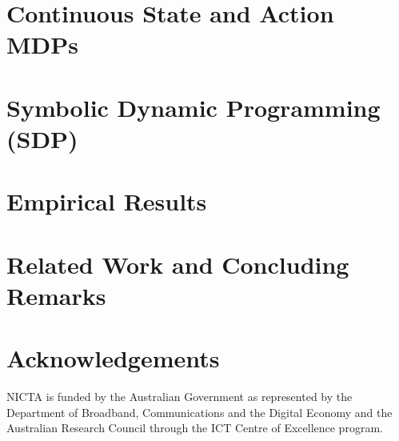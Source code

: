\documentclass[letterpaper]{article}
\begin{document}


\section{Continuous State and Action MDPs}



\section{Symbolic Dynamic Programming (SDP)}



\section{Empirical Results}



\section{Related Work and Concluding Remarks}






\section*{Acknowledgements}

NICTA is funded by the Australian Government as represented by
the Department of Broadband, Communications and the Digital
Economy and the Australian Research Council through the ICT
Centre of Excellence program.



\end{document}
